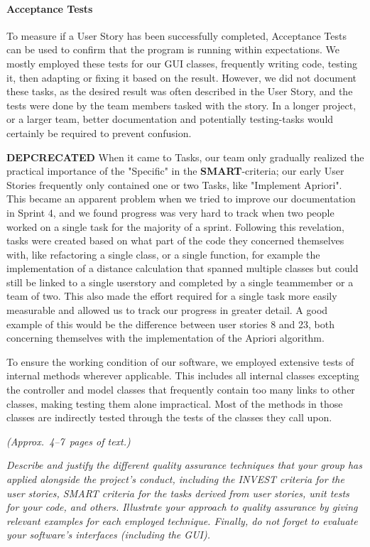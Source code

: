 \paragraph{Acceptance Tests}
To measure if a User Story has been successfully completed, Acceptance Tests can be used to confirm that the program is running within expectations. 
We mostly employed these tests for our GUI classes, frequently writing code, testing it, then adapting or fixing it based on the result. 
However, we did not document these tasks, as the desired result was often described in the User Story, and the tests were done by the team members tasked with the story. In a longer project, or a larger team, better documentation and potentially testing-tasks would certainly be required to prevent confusion.

\newpage
\textbf{DEPCRECATED}
When it came to Tasks, our team only gradually realized the practical importance of the "Specific" in the \textbf{ SMART}-criteria; our early User Stories frequently only contained one or two Tasks, like "Implement Apriori". This became an apparent problem when we tried to improve our documentation in Sprint 4, and we found progress was very hard to track when two people worked on a single task for the majority of a sprint. 
Following this revelation, tasks were created based on what part of the code they concerned themselves with, like refactoring a single class, or a single function, for example the implementation of a distance calculation that spanned multiple classes but could still be linked to a single userstory and completed by a single teammember or a team of two. 
This also made the effort required for a single task more easily measurable and allowed us to track our progress in greater detail. A good example of this would be the difference between user stories 8 and 23, both concerning themselves with the implementation of the Apriori algorithm.

To ensure the working condition of our software, we employed extensive tests of internal methods wherever applicable. 
This includes all internal classes excepting the controller and model classes that frequently contain too many links to other classes, making testing them alone impractical. Most of the methods in those classes are indirectly tested through the tests of the classes they call upon. 


\emph{(Approx.~4--7~pages of text.)}

\emph{Describe and justify the different quality assurance techniques that your group has applied alongside the project's conduct, including the INVEST criteria for the user stories, SMART criteria for the tasks derived from user stories, unit tests for your code, and others.  Illustrate your approach to quality assurance by giving relevant examples for each employed technique. Finally, do not forget to evaluate your software's interfaces (including the GUI).}

